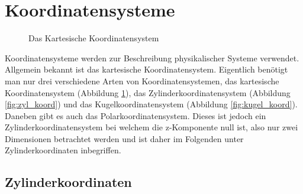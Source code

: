 \section{Koordinatensysteme}
\begin{figure}[h]
	\centering
	\caption[Kartesische Koordinaten]{Das Kartesische Koordinatensystem}
	\label{fig:kart_koord}
\end{figure}

Koordinatensysteme werden zur Beschreibung physikalischer Systeme verwendet. Allgemein bekannt ist das kartesische Koordinatensystem.
Eigentlich benötigt man nur drei verschiedene Arten von Koordinatensystemen, das kartesische Koordinatensystem (Abbildung \ref{fig:kart_koord}),  das Zylinderkoordinatensystem (Abbildung \ref{fig:zyl_koord}) und das Kugelkoordinatensystem (Abbildung \ref{fig:kugel_koord}). 
Daneben gibt es auch das Polarkoordinatensystem. Dieses ist jedoch ein Zylinderkoordinatensystem bei welchem die z-Komponente null ist, also nur zwei Dimensionen betrachtet werden und ist daher im Folgenden unter Zylinderkoordinaten inbegriffen. 

\subsection{Zylinderkoordinaten}


